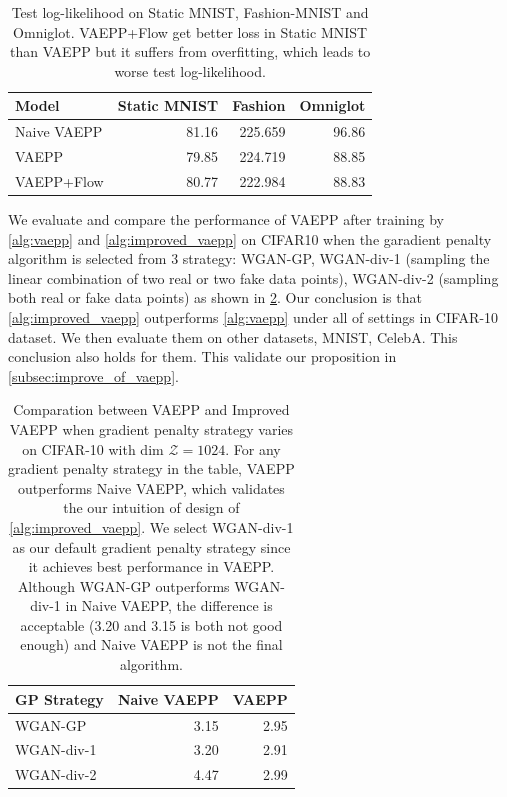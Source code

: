 \begin{table}[tb]
\centering
\begin{tabular}{lrrr}  
\toprule
Model   & Static MNIST & Fashion & Omniglot \\
\midrule
Naive VAEPP    &  81.16    &  225.659  &  96.86  \\
VAEPP          &  79.85    &  224.719  &  88.85   \\
VAEPP+Flow     &  80.77    &  222.984  &  88.83   \\
\bottomrule
\end{tabular}
\caption{Test log-likelihood on Static MNIST, Fashion-MNIST and Omniglot. VAEPP+Flow get better loss in Static MNIST than VAEPP but it suffers from overfitting, which leads to worse test log-likelihood. }
\label{tab:cifar-nll}
\end{table}
We evaluate and compare the performance of VAEPP after training by \cref{alg:vaepp} and \cref{alg:improved_vaepp} on CIFAR10 when the garadient penalty algorithm is selected from 3 strategy: WGAN-GP, WGAN-div-1  (sampling the linear combination of two real or two fake data points), WGAN-div-2 (sampling both real or fake data points) as shown in \cref{tab:compare_nD_over_R}. Our conclusion is that \cref{alg:improved_vaepp} outperforms \cref{alg:vaepp} under all of settings in CIFAR-10 dataset. We then evaluate them on other datasets, MNIST, CelebA. This conclusion also holds for them. This validate our proposition in \cref{subsec:improve_of_vaepp}. 
\begin{table}[tb]
\centering
\begin{tabular}{lrr}  
\toprule
GP Strategy  &  Naive VAEPP  & VAEPP \\
\midrule
WGAN-GP      &  3.15   & 2.95      \\
WGAN-div-1   &  3.20   & 2.91      \\
WGAN-div-2   &  4.47   & 2.99      \\
\bottomrule
\end{tabular}
\caption{Comparation between VAEPP and Improved VAEPP when gradient penalty strategy varies on CIFAR-10 with dim $\mathcal{Z} = 1024$. For any gradient penalty strategy in the table, VAEPP outperforms Naive VAEPP, which validates the our intuition of design of \cref{alg:improved_vaepp}. We select WGAN-div-1 as our default gradient penalty strategy since it achieves best performance in VAEPP. Although WGAN-GP outperforms WGAN-div-1 in Naive VAEPP, the difference is acceptable (3.20 and 3.15 is both not good enough) and Naive VAEPP is not the final algorithm. }
\label{tab:compare_nD_over_R}
\end{table}

